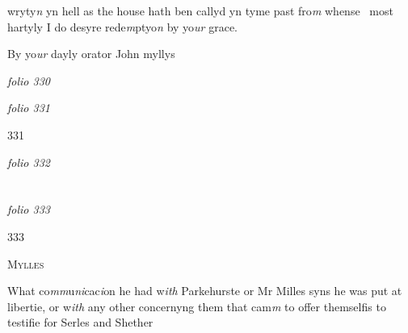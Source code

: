 \documentclass[12pt, a4paper]{book}
\begin{document}
wryty\textit{n} yn hell as the house hath ben callyd yn tyme past fro\textit{m} whense 
most hartyly I do desyre rede\textit{m}ptyo\textit{n} by yo\textit{ur} grace. 


		\ifthenelse{\isodd{\thepage}}
		{\reversemarginpar}
		{\normalmarginpar}
		By yo\textit{ur} dayly orator John myllys

\dotfill
						\newpage
{}

\textit{folio 330}


         \vspace*{4cm}
         
\dotfill
						

\textit{folio 331}


\begin{flushright}{\color{Mahogany}331}\end{flushright}

\dotfill
						\newpage
{}

\textit{folio 332}


         \vspace*{4cm}
         
\dotfill
						  \section*{}  \subsection*{}

\textit{folio 333}



\begin{flushright}{\color{Mahogany}333}\end{flushright}

				\begin{center} \begin{large} {\scshape Mylles} \end{large} \end{center}
			
            		

				\marginpar[\vspace{0.5cm}{\textcolor{Gray}{1}}]{}
			
            		
		\ifthenelse{\isodd{\thepage}}
		{\reversemarginpar}
		{\normalmarginpar}
		What co\textit{mm}u\textit{ni}cac\textit{i}on he had w\textit{ith} Parkehurste or Mr Milles syns
he was put at libertie, or w\textit{ith} any other concernyng them that
cam\textit{m} to offer themselfis to testifie for Serles and Shether
\end{document}
